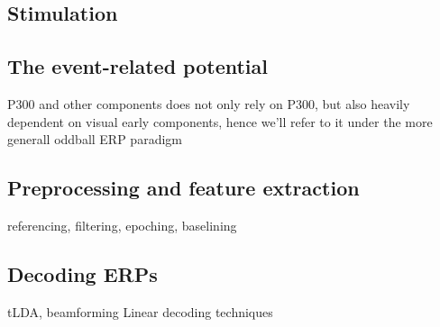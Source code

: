 \subsection{Stimulation}
\subsection{The event-related potential}
P300 and other components
does not only rely on P300, but also heavily dependent on visual early
components, hence we'll refer to it under the more generall oddball ERP
paradigm
\subsection{Preprocessing and feature extraction}
referencing, filtering, epoching, baselining
\subsection{Decoding ERPs}
tLDA, beamforming
Linear decoding techniques
